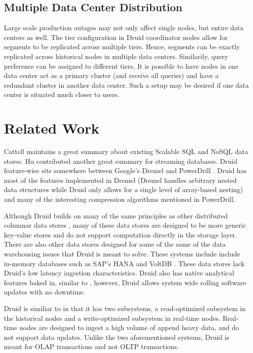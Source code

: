 \documentclass{sig-alternate-2013}
\begin{document}
\subsection{Multiple Data Center Distribution}
Large scale production outages may not only affect single nodes, but entire
data centers as well. The tier configuration in Druid coordinator nodes allow
for segments to be replicated across multiple tiers. Hence, segments can be
exactly replicated across historical nodes in multiple data centers.
Similarily, query preference can be assigned to different tiers. It is possible
to have nodes in one data center act as a primary cluster (and receive all
queries) and have a redundant cluster in another data center. Such a setup may
be desired if one data center is situated much closer to users. 

\section{Related Work}
\label{sec:related}
Cattell \cite{cattell2011scalable} maintains a great summary about existing
Scalable SQL and NoSQL data stores. Hu \cite{hu2011stream} contributed another
great summary for streaming databases.  Druid feature-wise sits somewhere
between Google’s Dremel \cite{melnik2010dremel} and PowerDrill
\cite{hall2012processing}. Druid has most of the features implemented in Dremel
(Dremel handles arbitrary nested data structures while Druid only allows for a
single level of array-based nesting) and many of the interesting compression
algorithms mentioned in PowerDrill.

Although Druid builds on many of the same principles as other distributed
columnar data stores \cite{fink2012distributed}, many of these data stores are
designed to be more generic key-value stores \cite{lakshman2010cassandra} and do not
support computation directly in the storage layer.  There are also other data
stores designed for some of the same of the data warehousing issues that Druid
is meant to solve. These systems include include in-memory databases such as
SAP’s HANA \cite{farber2012sap} and VoltDB \cite{voltdb2010voltdb}. These data
stores lack Druid's low latency ingestion characteristics. Druid also has
native analytical features baked in, similar to \cite{paraccel2013}, however,
Druid allows system wide rolling software updates with no downtime.  

Druid is similiar to \cite{stonebraker2005c, cipar2012lazybase} in that it has
two subsystems, a read-optimized subsystem in the historical nodes and a
write-optimized subsystem in real-time nodes. Real-time nodes are designed to
ingest a high volume of append heavy data, and do not support data updates.
Unlike the two aforementioned systems, Druid is meant for OLAP transactions and
not OLTP transactions.
\end{document}
